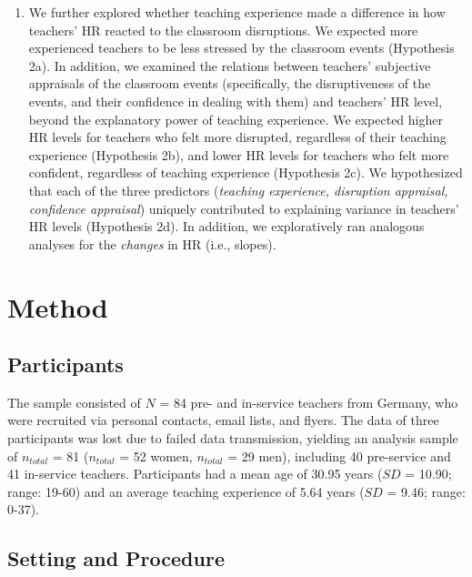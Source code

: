 \documentclass[preprint,
3p]{elsarticle} %
\providecommand{\tightlist}{%
  \setlength{\itemsep}{0pt}\setlength{\parskip}{0pt}}
\begin{document}
\begin{enumerate}
\def\labelenumi{(\arabic{enumi})}
\setcounter{enumi}{1}
\tightlist
\item
  We further explored whether teaching experience made a difference in
  how teachers' HR reacted to the classroom disruptions. We expected
  more experienced teachers to be less stressed by the classroom events
  (Hypothesis 2a). In addition, we examined the relations between
  teachers' subjective appraisals of the classroom events (specifically,
  the disruptiveness of the events, and their confidence in dealing with
  them) and teachers' HR level, beyond the explanatory power of teaching
  experience. We expected higher HR levels for teachers who felt more
  disrupted, regardless of their teaching experience (Hypothesis 2b),
  and lower HR levels for teachers who felt more confident, regardless
  of teaching experience (Hypothesis 2c). We hypothesized that each of
  the three predictors (\emph{teaching experience, disruption appraisal,
  confidence appraisal}) uniquely contributed to explaining variance in
  teachers' HR levels (Hypothesis 2d). In addition, we exploratively ran
  analogous analyses for the \emph{changes} in HR (i.e., slopes).
\end{enumerate}

\section{Method}\label{method}

\subsection{Participants}\label{participants}

The sample consisted of \(N\) = 84 pre- and in-service teachers from
Germany, who were recruited via personal contacts, email lists, and
flyers. The data of three participants was lost due to failed data
transmission, yielding an analysis sample of \(n_{total}\) = 81
(\(n_{total}\) = 52 women, \(n_{total}\) = 29 men), including 40
pre-service and 41 in-service teachers. Participants had a mean age of
30.95 years (\(SD\) = 10.90; range: 19-60) and an average teaching
experience of 5.64 years (\(SD\) = 9.46; range: 0-37).

\subsection{Setting and Procedure}\label{setting-and-procedure}
\end{document}
